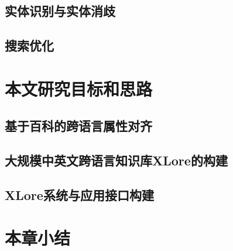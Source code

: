 \subsection{实体识别与实体消歧}
\label{sec:}

\subsection{搜索优化}

\section{本文研究目标和思路}

\subsection{基于百科的跨语言属性对齐}
\label{sec:}

\subsection{大规模中英文跨语言知识库XLore的构建}
\label{sec:}

\subsection{XLore系统与应用接口构建}
\label{sec:}

\section{本章小结}


